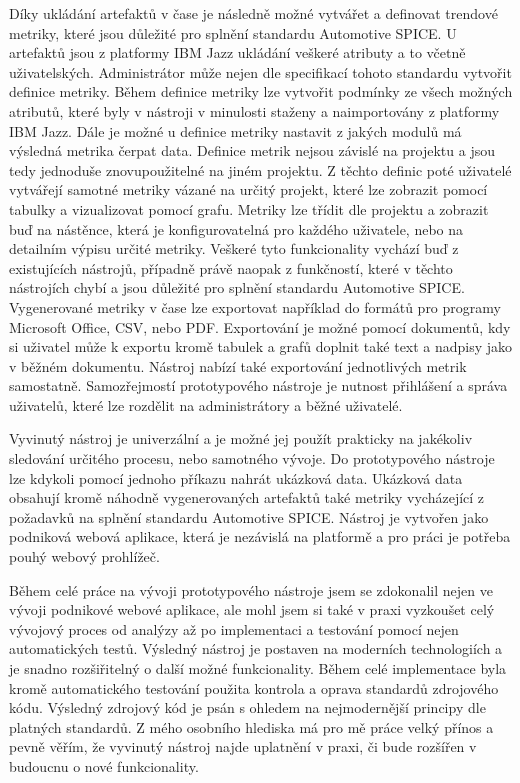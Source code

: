 \documentclass[czech,master]{diploma}
\begin{document}
Díky ukládání artefaktů v čase je následně možné vytvářet a definovat trendové metriky, které jsou důležité pro splnění standardu Automotive SPICE. U artefaktů jsou z platformy IBM Jazz ukládání veškeré atributy a to včetně uživatelských. Administrátor může nejen dle specifikací tohoto standardu vytvořit definice metriky. Během definice metriky lze vytvořit podmínky ze všech možných atributů, které byly v nástroji v minulosti staženy a naimportovány z platformy IBM Jazz. Dále je možné u definice metriky nastavit z jakých modulů má výsledná metrika čerpat data. Definice metrik nejsou závislé na projektu a jsou tedy jednoduše znovupoužitelné na jiném projektu. Z těchto definic poté uživatelé vytvářejí samotné metriky vázané na určitý projekt, které lze zobrazit pomocí tabulky a vizualizovat pomocí grafu. Metriky lze třídit dle projektu a zobrazit buď na nástěnce, která je konfigurovatelná pro každého uživatele, nebo na detailním výpisu určité metriky. Veškeré tyto funkcionality vychází buď z existujících nástrojů, případně právě naopak z funkčností, které v těchto nástrojích chybí a jsou důležité pro splnění standardu Automotive SPICE. Vygenerované metriky v čase lze exportovat například do formátů pro programy Microsoft Office, CSV, nebo PDF. Exportování je možné pomocí dokumentů, kdy si uživatel může k exportu kromě tabulek a grafů doplnit také text a nadpisy jako v běžném dokumentu. Nástroj nabízí také exportování jednotlivých metrik samostatně. Samozřejmostí prototypového nástroje je nutnost přihlášení a správa uživatelů, které lze rozdělit na administrátory a běžné uživatelé.

Vyvinutý nástroj je univerzální a je možné jej použít prakticky na jakékoliv sledování určitého procesu, nebo samotného vývoje. Do prototypového nástroje lze kdykoli pomocí jednoho příkazu nahrát ukázková data. Ukázková data obsahují kromě náhodně vygenerovaných artefaktů také metriky vycházející z požadavků na splnění standardu Automotive SPICE. Nástroj je vytvořen jako podniková webová aplikace, která je nezávislá na platformě a pro práci je potřeba pouhý webový prohlížeč.

Během celé práce na vývoji prototypového nástroje jsem se zdokonalil nejen ve vývoji podnikové webové aplikace, ale mohl jsem si také v praxi vyzkoušet celý vývojový proces od analýzy až po implementaci a testování pomocí nejen automatických testů. Výsledný nástroj je postaven na moderních technologiích a je snadno rozšiřitelný o další možné funkcionality. Během celé implementace byla kromě automatického testování použita kontrola a oprava standardů zdrojového kódu. Výsledný zdrojový kód je psán s ohledem na nejmodernější principy dle platných standardů. Z mého osobního hlediska má pro mě práce velký přínos a pevně věřím, že vyvinutý nástroj najde uplatnění v praxi, či bude rozšířen v budoucnu o nové funkcionality.
\end{document}
